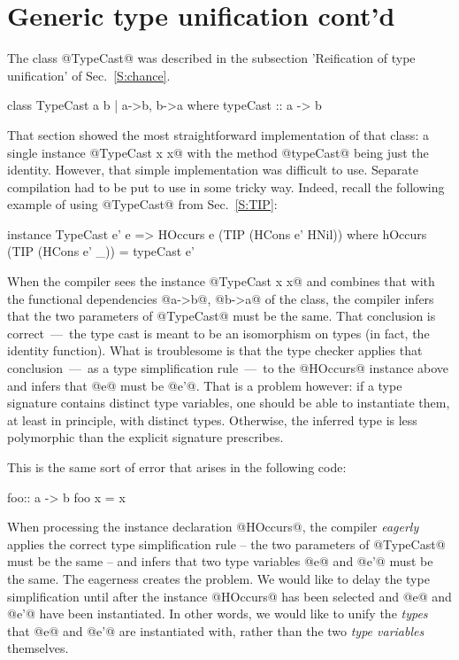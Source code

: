 \documentclass[nocopyrightspace,preprint]{sigplan-proc}
\newcommand{\hwVsTr}[2]{#2}
\begin{document}
\hwVsTr{}{\newpage}

\section{Generic type unification cont'd}
\label{A:TwoClass}

The class @TypeCast@ was described in the subsection 'Reification of
type unification' of Sec.~\ref{S:chance}. 

\begin{code}
 class TypeCast a b | a->b, b->a
  where typeCast :: a -> b
\end{code}

That section showed the most straightforward implementation of that
class: a single instance @TypeCast x x@ with the method @typeCast@
being just the identity. However, that simple implementation was
difficult to use. Separate compilation had to be put to use in some
tricky way. Indeed, recall the following example of using @TypeCast@
from Sec.~\ref{S:TIP}:

\begin{code}
 instance TypeCast e' e
       => HOccurs e (TIP (HCons e' HNil))
 where    hOccurs (TIP (HCons e' _)) = typeCast e'
\end{code}

When the compiler sees the instance @TypeCast x x@ and combines that
with the functional dependencies @a->b@, @b->a@ of the class, the
compiler infers that the two parameters of @TypeCast@ must be the
same. That conclusion is correct~---~the type cast is meant to be an
isomorphism on types (in fact, the identity function). What is
troublesome is that the type checker applies that conclusion~---~as a
type simplification rule~---~to the @HOccurs@ instance above and
infers that @e@ must be @e'@. That is a problem however: if a type
signature contains distinct type variables, one should be able to
instantiate them, at least in principle, with distinct
types. Otherwise, the inferred type is less polymorphic than the
explicit signature prescribes.

This is the same sort of error that arises in the following code:

\begin{code}
 foo:: a -> b
 foo x = x
\end{code}

When processing the instance declaration @HOccurs@, the compiler
\emph{eagerly} applies the correct type simplification rule -- the two
parameters of @TypeCast@ must be the same -- and infers that two type
variables @e@ and @e'@ must be the same. The eagerness creates the
problem. We would like to delay the type simplification until after
the instance @HOccurs@ has been selected and @e@ and @e'@ have been
instantiated. In other words, we would like to unify the \emph{types}
that @e@ and @e'@ are instantiated with, rather than the two
\emph{type variables} themselves.
\end{document}
